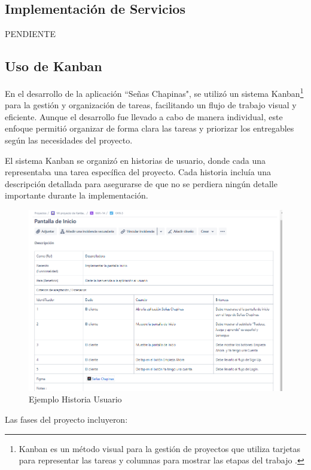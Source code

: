 
\subsection{Implementación de Servicios}
PENDIENTE


\subsection{Uso de Kanban}

En el desarrollo de la aplicación ``Señas Chapinas", se utilizó un sistema Kanban\footnote{Kanban es un método visual para la gestión de proyectos que utiliza tarjetas para representar las tareas y columnas para mostrar las etapas del trabajo \cite{asana2024}.} para la gestión y organización de tareas, facilitando un flujo de trabajo visual y eficiente. Aunque el desarrollo fue llevado a cabo de manera individual, este enfoque permitió organizar de forma clara las tareas y priorizar los entregables según las necesidades del proyecto.

El sistema Kanban se organizó en historias de usuario, donde cada una representaba una tarea específica del proyecto. Cada historia incluía una descripción detallada para asegurarse de que no se perdiera ningún detalle importante durante la implementación.

\begin{figure}  [H]
    \centering
    \includegraphics[width=0.6\linewidth]{figuras/kabana_ejemplo.png}
    \caption{Ejemplo Historia Usuario}
    \label{fig:enter-label}
\end{figure}


Las fases del proyecto incluyeron:

